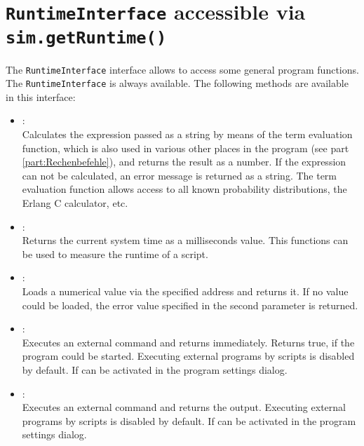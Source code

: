 \chapter{\texttt{RuntimeInterface} accessible via \texttt{sim.getRuntime()}}

The \texttt{RuntimeInterface} interface allows to access some general program functions.\\
The \texttt{RuntimeInterface} is always available. The following methods are available in this interface:

\begin{itemize}

\item
{}:\\
Calculates the expression passed as a string by means of the term evaluation function,
which is also used in various other places in the program (see part \ref{part:Rechenbefehle}), and returns the result as a  number.
If the expression can not be calculated, an error message is returned as a string.
The term evaluation function allows access to all known probability distributions,
the Erlang C calculator, etc.

\item
{}:\\
Returns the current system time as a milliseconds value. This functions can be used to measure
the runtime of a script.

\item
{}:\\
Loads a numerical value via the specified address and returns it.
If no value could be loaded, the error value specified in the second parameter is returned.

\item
{}:\\
Executes an external command and returns immediately. Returns true, if the program could be started.
Executing external programs by scripts is disabled by default. If can be activated
in the program settings dialog.

\item
{}:\\
Executes an external command and returns the output.
Executing external programs by scripts is disabled by default. If can be activated
in the program settings dialog.


\end{itemize}
